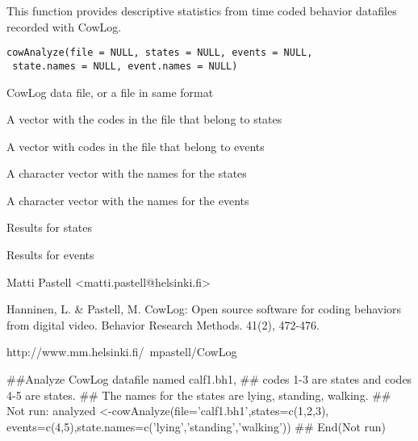 \documentclass{book}
\begin{document}
\begin{Description}\relax
This function provides descriptive statistics from time coded behavior
datafiles recorded with CowLog.
\end{Description}
\begin{Usage}
\begin{verbatim}
cowAnalyze(file = NULL, states = NULL, events = NULL,
 state.names = NULL, event.names = NULL)
\end{verbatim}
\end{Usage}
\begin{Arguments}
\begin{ldescription}
\item[\code{file}] CowLog data file, or a file in same format
\item[\code{states}] A vector with the codes in the file that belong to states
\item[\code{events}] A vector with codes in the file that belong to events
\item[\code{state.names}] A character vector with the names for the states 
\item[\code{event.names}] A character vector with the names for the events
\end{ldescription}
\end{Arguments}
\begin{Value}
\begin{ldescription}
\item[\code{state}] Results for states
\item[\code{event}] Results for events
\end{ldescription}
\end{Value}
\begin{Author}\relax
Matti Pastell <matti.pastell@helsinki.fi>
\end{Author}
\begin{References}\relax
Hanninen, L. \& Pastell, M. CowLog: Open source software for coding
behaviors from digital video. Behavior Research Methods. 41(2),
472-476.

http://www.mm.helsinki.fi/~mpastell/CowLog
\end{References}
\begin{Examples}
\begin{ExampleCode}
##Analyze CowLog datafile named calf1.bh1,
## codes 1-3 are states and codes 4-5 are states.
## The names for the states are lying, standing, walking.
## Not run: 
analyzed <-cowAnalyze(file='calf1.bh1',states=c(1,2,3),
events=c(4,5),state.names=c('lying','standing','walking'))
## End(Not run)
 
\end{ExampleCode}
\end{Examples}
\end{document}
